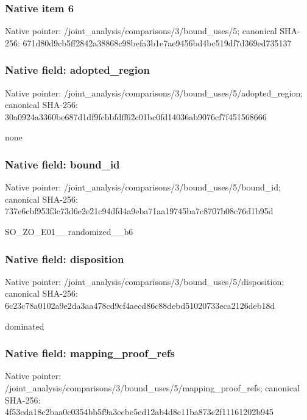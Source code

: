 \documentclass[10pt,a4paper]{article}
\begin{document}
\subsubsection{Native item 6}
Native pointer: /joint\_\allowbreak{}analysis/comparisons/3/bound\_\allowbreak{}uses/5; canonical SHA-256: 671d80d9cb5ff2842a38868c98befa3b1e7ae9456bd4bc519df7d369ed735137

\subsubsection{Native field: adopted\_\allowbreak{}region}
Native pointer: /joint\_\allowbreak{}analysis/comparisons/3/bound\_\allowbreak{}uses/5/adopted\_\allowbreak{}region; canonical SHA-256: 30a0924a3360be687d1df9fcbbfdff62c01bc0fd14036ab9076cf7f451568666

\begingroup\raggedright\sloppy none\par\endgroup

\subsubsection{Native field: bound\_\allowbreak{}id}
Native pointer: /joint\_\allowbreak{}analysis/comparisons/3/bound\_\allowbreak{}uses/5/bound\_\allowbreak{}id; canonical SHA-256: 737e6cbf953f3c73d6e2e21c94dfd4a9eba71aa19745ba7c8707b08c76d1b95d

\begingroup\raggedright\sloppy SO\_\allowbreak{}ZO\_\allowbreak{}E01\_\allowbreak{}\_\allowbreak{}randomized\_\allowbreak{}\_\allowbreak{}b6\par\endgroup

\subsubsection{Native field: disposition}
Native pointer: /joint\_\allowbreak{}analysis/comparisons/3/bound\_\allowbreak{}uses/5/disposition; canonical SHA-256: 6c23c78a0102a9e2da3aa478cd9cf4aecd86c88debd51020733eca2126deb18d

\begingroup\raggedright\sloppy dominated\par\endgroup

\subsubsection{Native field: mapping\_\allowbreak{}proof\_\allowbreak{}refs}
Native pointer: /joint\_\allowbreak{}analysis/comparisons/3/bound\_\allowbreak{}uses/5/mapping\_\allowbreak{}proof\_\allowbreak{}refs; canonical SHA-256: 4f53cda18c2baa0c0354bb5f9a3ecbe5ed12ab4d8e11ba873c2f11161202b945
\end{document}
